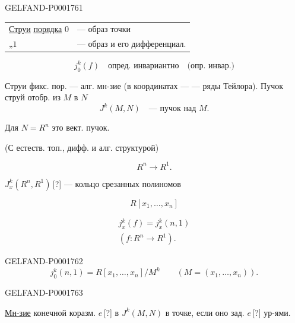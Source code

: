 \begin{GelfandAdjacentEvidence}{GELFAND-P000176}{1}
\begin{tabular}{@{}ll@{}}
\underline{Струи} \underline{порядка} $0$&— образ точки\\
\quad„\quad $1$&— образ и его дифференциал.
\end{tabular}

\begin{equation*}j_0^k(f)\quad\text{опред. инвариантно}\quad\text{(опр. инвар.)}\end{equation*}

Струи фикс. пор. — алг. мн-зие (в координатах — — ряды Тейлора). Пучок струй отобр. из $M$ в $N$
\begin{equation*}J^k(M,N)\quad\text{— пучок над }M.\end{equation*}

Для $N=R^n$ это вект. пучок.

(С естеств. топ., дифф. и алг. структурой)

\begin{equation*}R^n\longrightarrow R^1.\end{equation*}

$J_x^k(R^n,R^1)$\,[?] — кольцо срезанных полиномов
\end{GelfandAdjacentEvidence}

\begin{equation*}R[x_1,\ldots,x_n]\end{equation*}

\begin{gather*}j_x^k(f)=j_x^k(n,1)\\(f:R^n\to R^1).\end{gather*}

\begin{GelfandAdjacentEvidence}{GELFAND-P000176}{2}
\begin{equation*}j_0^k(n,1)=R[x_1,\ldots,x_n]/M^k\qquad(M=(x_1,\ldots,x_n)).\end{equation*}
\end{GelfandAdjacentEvidence}
\begin{GelfandAdjacentEvidence}{GELFAND-P000176}{3}

\underline{Мн-зие} конечной коразм. $e$\,[?] в $J^k(M,N)$ в точке, если оно зад. $e$\,[?] ур-ями.
\end{GelfandAdjacentEvidence}


